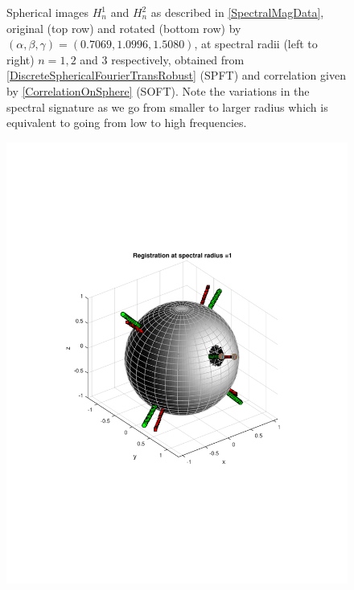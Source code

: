 \documentclass{UCF_ETD}
\begin{document}
\begin{figure}[H]
\begin{center}
\caption{ Spherical images $H^1_n$ and $H^2_n$ as described in \eqref{SpectralMagData}, original (top row) and rotated (bottom row) by $(\alpha, \beta, \gamma) = (0.7069, 1.0996, 1.5080)$, at spectral radii (left to right) $n = 1,2$ and $3$ respectively, obtained from \eqref{DiscreteSphericalFourierTransRobust} (SPFT) and correlation given by \eqref{CorrelationOnSphere} (SOFT). Note the variations in the spectral signature as we go from smaller to larger radius which is equivalent to going from low to high frequencies. }
\label{3DRegistrationSphericalImages.fig}
\end{center}
\end{figure}

\begin{figure}[H] 
\begin{center}
\includegraphics[scale=0.38]{RobustRegistration/SphericalImageWrapped1Rotated}

\end{center}
\end{figure}
\end{document}
